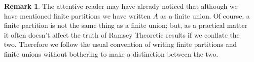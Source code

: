 \documentclass[12pt]{article}
\theoremstyle{plain}
\newtheorem*{roth}{Roth's Theorem}
\theoremstyle{definition}
\newtheorem*{defn}{Definition}
\newtheorem*{rmk}{Remark}
\newcommand{\bbN}{\mathbb{N}}
\begin{document}
  \begin{rmk}
    The attentive reader may have already noticed that
    although we have mentioned finite partitions we have written $A$
    as a finite union.
    Of course, a finite partition is not the same thing as a finite
    union; but, as a practical matter it often doesn't affect the
    truth of Ramsey Theoretic results if we conflate the two. 
    Therefore we follow the usual convention of writing finite
    partitions and finite unions without bothering to make a
    distinction between the two.
  \end{rmk}





\end{document}
